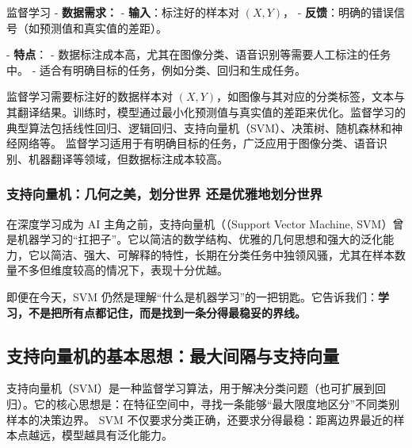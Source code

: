 %

监督学习
- {\bf 数据需求：}
  - {\bf 输入}：标注好的样本对 $(X, Y)$，
  - {\bf 反馈}：明确的错误信号（如预测值和真实值的差距）。
  
- {\bf 特点}：
  - 数据标注成本高，尤其在图像分类、语音识别等需要人工标注的任务中。
  - 适合有明确目标的任务，例如分类、回归和生成任务。

监督学习需要标注好的数据样本对 $(X, Y)$，如图像与其对应的分类标签，文本与其翻译结果。训练时，模型通过最小化预测值与真实值的差距来优化。监督学习的典型算法包括线性回归、逻辑回归、支持向量机（SVM）、决策树、随机森林和神经网络等。
监督学习适用于有明确目标的任务，广泛应用于图像分类、语音识别、机器翻译等领域，但数据标注成本较高。

\subsubsection{支持向量机：几何之美，划分世界 还是优雅地划分世界}
在深度学习成为 AI 主角之前，支持向量机（（Support Vector Machine, SVM）曾是机器学习的“扛把子”。它以简洁的数学结构、优雅的几何思想和强大的泛化能力，它以简洁、强大、可解释的特性，长期在分类任务中独领风骚，尤其在样本数量不多但维度较高的情况下，表现十分优越。

即便在今天，SVM 仍然是理解“什么是机器学习”的一把钥匙。它告诉我们：{\bf 学习，不是把所有点都记住，而是找到一条分得最稳妥的界线。}

\subsection{支持向量机的基本思想：最大间隔与支持向量}

支持向量机（SVM）是一种监督学习算法，用于解决分类问题（也可扩展到回归）。它的核心思想是：在特征空间中，寻找一条能够“最大限度地区分”不同类别样本的决策边界。
SVM 不仅要求分类正确，还要求分得最稳：距离边界最近的样本点越远，模型越具有泛化能力。

